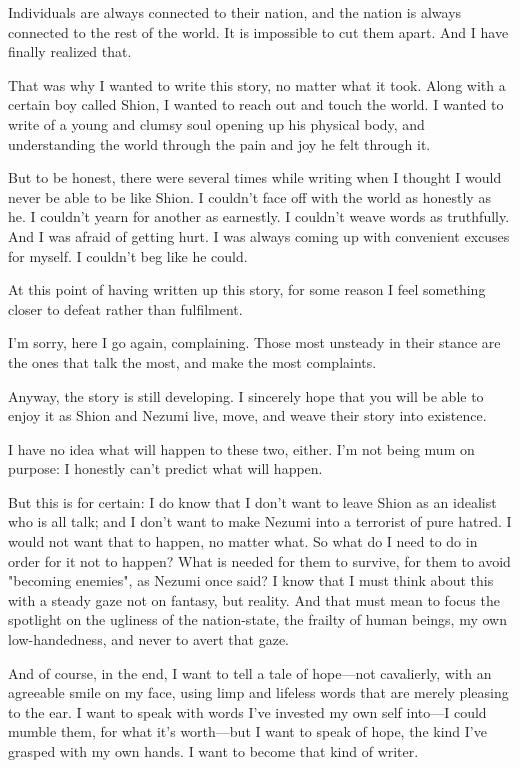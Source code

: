 Individuals are always connected to their nation, and the nation is
always connected to the rest of the world. It is impossible to cut them
apart. And I have finally realized that.

That was why I wanted to write this story, no matter what it took. Along
with a certain boy called Shion, I wanted to reach out and touch the
world. I wanted to write of a young and clumsy soul opening up his
physical body, and understanding the world through the pain and joy he
felt through it.

But to be honest, there were several times while writing when I thought
I would never be able to be like Shion. I couldn't face off with the
world as honestly as he. I couldn't yearn for another as earnestly. I
couldn't weave words as truthfully. And I was afraid of getting hurt. I
was always coming up with convenient excuses for myself. I couldn't beg
like he could.

At this point of having written up this story, for some reason I feel
something closer to defeat rather than fulfilment.

I'm sorry, here I go again, complaining. Those most unsteady in their
stance are the ones that talk the most, and make the most complaints.

Anyway, the story is still developing. I sincerely hope that you will be
able to enjoy it as Shion and Nezumi live, move, and weave their story
into existence.

I have no idea what will happen to these two, either. I'm not being mum
on purpose: I honestly can't predict what will happen.

But this is for certain: I do know that I don't want to leave Shion as
an idealist who is all talk; and I don't want to make Nezumi into a
terrorist of pure hatred. I would not want that to happen, no matter
what. So what do I need to do in order for it not to happen? What is
needed for them to survive, for them to avoid "becoming enemies", as
Nezumi once said? I know that I must think about this with a steady gaze
not on fantasy, but reality. And that must mean to focus the spotlight
on the ugliness of the nation-state, the frailty of human beings, my own
low-handedness, and never to avert that gaze.

And of course, in the end, I want to tell a tale of hope---not cavalierly,
with an agreeable smile on my face, using limp and lifeless words that
are merely pleasing to the ear. I want to speak with words I've invested
my own self into---I could mumble them, for what it's worth---but I want to
speak of hope, the kind I've grasped with my own hands. I want to become
that kind of writer.

